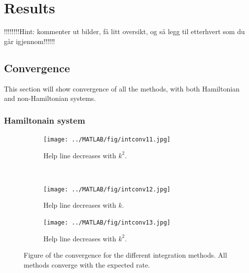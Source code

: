 \chapter{Results}
!!!!!!!!Hint: kommenter ut bilder, få litt oversikt, og så legg til etterhvert som du går igjennom!!!!!!\\
\section{Convergence}%
This section will show convergence of all the methods, with both Hamiltonian and non-Hamiltonian systems. 

\subsection{Hamiltonain system}%
\begin{figure}[H]
        \centering
        \begin{subfigure}[b]{0.30\textwidth}
                \texttt{[image: ../MATLAB/fig/intconv11.jpg]}
                \caption{ Help line decreases with $k^2$. }
                \label{fig:intconvtrap}
        \end{subfigure}
        ~
        \begin{subfigure}[b]{0.30\textwidth}
                \texttt{[image: ../MATLAB/fig/intconv12.jpg]}
                \caption{ Help line decreases with $k$. }
                \label{fig:intconveul}
        \end{subfigure}
        \begin{subfigure}[b]{0.30\textwidth}
                \texttt{[image: ../MATLAB/fig/intconv13.jpg]}
                \caption{ Help line decreases with $k^2$. }
                \label{fig:intconvmid}
        \end{subfigure}
\caption{Figure of the convergence for the different integration methods. All methods converge with the expected rate.}
\label{fig:intconv}
\end{figure}
